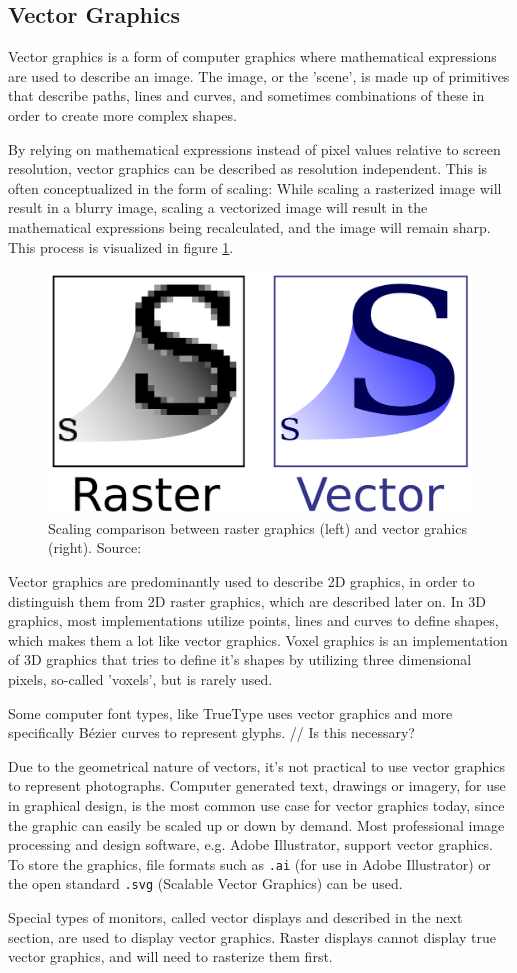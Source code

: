 \subsection{Vector Graphics}
Vector graphics is a form of computer graphics where mathematical expressions are used to describe an image. 
The image, or the 'scene', is made up of primitives that describe paths, lines and curves, and sometimes combinations of these in order to create more complex shapes.

By relying on mathematical expressions instead of pixel values relative to screen resolution, vector graphics can be described as resolution independent. 
This is often conceptualized in the form of scaling: While scaling a rasterized image will result in a blurry image, scaling a vectorized image will result in the mathematical expressions being recalculated, and the image will remain sharp. 
This process is visualized in figure \ref{fig:vectorscaling}.

\begin{figure}[h!]
\centering \includegraphics[width=0.5\linewidth]{images/bm_vs_svg.png}
\caption{Scaling comparison between raster graphics (left) and vector grahics (right). Source: \cite{svg}}
\label{fig:vectorscaling}
\end{figure}

Vector graphics are predominantly used to describe 2D graphics, in order to distinguish them from 2D raster graphics, which are described later on. 
In 3D graphics, most implementations utilize points, lines and curves to define shapes, which makes them a lot like vector graphics. 
Voxel graphics is an implementation of 3D graphics that tries to define it's shapes by utilizing three dimensional pixels, so-called 'voxels', but is rarely used.

Some computer font types, like TrueType uses vector graphics and more specifically Bézier curves to represent glyphs\cite{truetype}. // Is this necessary?

Due to the geometrical nature of vectors, it's not practical to use vector graphics to represent photographs. 
Computer generated text, drawings or imagery, for use in graphical design, is the most common use case for vector graphics today, since the graphic can easily be scaled up or down by demand. 
Most professional image processing and design software, e.g. Adobe Illustrator, support vector graphics. 
To store the graphics, file formats such as \texttt{.ai} (for use in Adobe Illustrator) or the open standard \texttt{.svg} (Scalable Vector Graphics) can be used.

Special types of monitors, called vector displays and described in the next section, are used to display vector graphics. 
Raster displays cannot display true vector graphics, and will need to rasterize them first.
